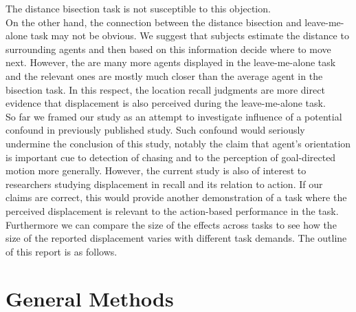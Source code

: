 \documentclass[10pt]{article}
\begin{document}
The distance bisection task is not susceptible to this objection.\\
On the other hand, the connection between the distance bisection and leave-me-alone task may not be obvious. 
We suggest that subjects estimate the distance to surrounding agents and then based on this information decide where to move next. 
However, the are many more agents displayed in the leave-me-alone task and the relevant ones are mostly much closer than the average agent in the bisection task. 
In this respect, the location recall judgments are more direct evidence that displacement is also perceived during the leave-me-alone task. \\
So far we framed our study as an attempt to investigate influence of a potential confound in previously published study. 
Such confound would seriously undermine the conclusion of this study, notably the claim that agent's orientation is important cue to detection of chasing and to the perception of goal-directed motion more generally. %
However, the current study is also of interest to researchers studying displacement in recall and its relation to action. 
If our claims are correct, this would provide another demonstration of a task where the perceived displacement is relevant to the action-based performance in the task. 
Furthermore we can compare the size of the effects across tasks to see how the size of the reported displacement varies with different task demands.
The outline of this report is as follows. %


\section*{General Methods}
\end{document}
